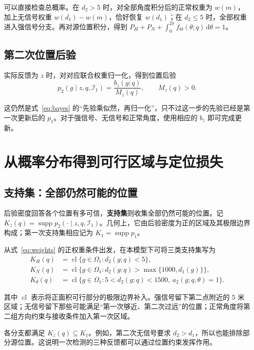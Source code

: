 \documentclass[UTF8,a4paper,zihao=-4,fontset=none]{ctexart}
\numberwithin{equation}{section}
\newcommand{\dd}{\,\mathrm d}
\newcommand{\supp}{\operatorname{supp}}
\newcommand{\cl}{\operatorname{cl}}
\begin{document}
可以直接检查总概率。在 \(d_2>5\) 时，对全部角度积分后的正常权重为 \(w(m)\)，加上无信号权重 \(w(d_1)-w(m)\)，恰好恢复 \(w(d_1)\)；在 \(d_2\le5\) 时，全部权重进入强信号分支。再对源位置积分，得到 \(P_H+P_N+\int_0^{2\pi}f_\Theta(\theta;q)\dd\theta=1\)。

\subsection{第二次位置后验}
实际反馈为 \(z\) 时，对对应联合权重归一化，得到位置后验
\begin{equation}\label{eq:posterior2}
p_2(g\mid z,q,\mathcal I_1)=\frac{b_z(g;q)}{M_z(q)},\qquad M_z(q)>0.
\end{equation}

这仍然是式~\eqref{eq:bayes} 的“先验乘似然，再归一化”，只不过这一步的先验已经是第一次更新后的 \(p_1\)。对于强信号、无信号和正常角度，使用相应的 \(b_z\) 即可完成更新。

\section{从概率分布得到可行区域与定位损失}
\subsection{支持集：全部仍然可能的位置}
后验密度回答各个位置有多可信，\textbf{支持集}则收集全部仍然可能的位置。记 \(K_z(q)=\supp p_2(\cdot\mid z,q,\mathcal I_1)\)。几何上，它由后验密度为正的区域及其极限边界构成；第一次支持集相应记为 \(K_1=\supp p_1\)。

从式~\eqref{eq:weights} 的正权重条件出发，在本模型下可将三类支持集写为
\begin{equation}\label{eq:support}
\begin{aligned}
K_H(q)&=\cl\{g\in\Omega_1:d_2(g;q)<5\},\\
K_N(q)&=\cl\{g\in\Omega_1:d_2(g;q)>\max\{1000,d_1(g)\}\},\\
K_\theta(q)&=\cl\{g\in\Omega_1:5<d_2(g;q)<1500,\ a_2(g;q,\theta)=1\}.
\end{aligned}
\end{equation}

其中 \(\cl\) 表示将正面积可行部分的极限边界补入。强信号留下第二点附近的 \(5\) 米区域；无信号留下那些可能满足“第一次够近、第二次过远”的位置；正常角度将第二组方向约束与接收条件加入第一次区域。

各分支都满足 \(K_z(q)\subseteq K_1\)。例如，第二次无信号要求 \(d_2>d_1\)，所以也能排除部分源位置。这说明一次检测的三种反馈都可以通过位置约束发挥作用。
\end{document}
